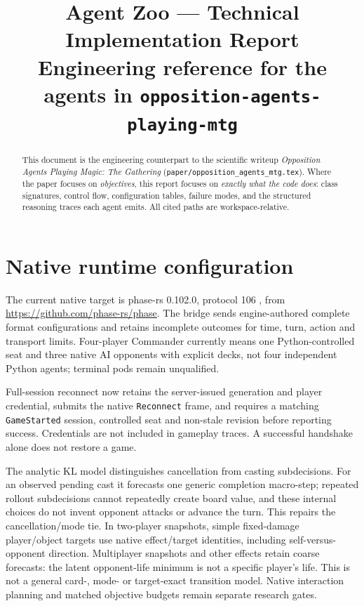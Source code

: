 \documentclass[11pt,a4paper]{article}
\title{\bfseries Agent Zoo --- Technical Implementation Report\\
       \large Engineering reference for the agents in
       \texttt{opposition-agents-playing-mtg}}
\author{}
\date{}
\begin{document}
\maketitle

\begin{abstract}
This document is the engineering counterpart to the scientific writeup
\emph{Opposition Agents Playing Magic: The Gathering} (\texttt{paper/opposition\_agents\_mtg.tex}).
Where the paper focuses on \emph{objectives}, this report focuses on
\emph{exactly what the code does}: class signatures, control flow,
configuration tables, failure modes, and the structured reasoning
traces each agent emits.  All cited paths are workspace-relative.
\end{abstract}

\tableofcontents
\bigskip

\section*{Native runtime configuration}

The current native target is phase-rs 0.102.0, protocol 106 \cite{phase2026engine},
from \url{https://github.com/phase-rs/phase}. The bridge sends
engine-authored complete format configurations and retains incomplete outcomes
for time, turn, action and transport limits. Four-player Commander currently
means one Python-controlled seat and three native AI opponents with explicit
decks, not four independent Python agents; terminal pods remain unqualified.

Full-session reconnect now retains the server-issued generation and player
credential, submits the native \texttt{Reconnect} frame, and requires a matching
\texttt{GameStarted} session, controlled seat and non-stale revision before
reporting success. Credentials are not included in gameplay traces. A successful
handshake alone does not restore a game.

The analytic KL model distinguishes cancellation from casting subdecisions.
For an observed pending cast it forecasts one generic completion macro-step;
repeated rollout subdecisions cannot repeatedly create board value, and these
internal choices do not invent opponent attacks or advance the turn. This
repairs the cancellation/mode tie. In two-player snapshots, simple fixed-damage
player/object targets use native effect/target identities, including
self-versus-opponent direction. Multiplayer snapshots and other effects retain
coarse forecasts: the latent opponent-life minimum is not a specific player's
life. This is not a general card-, mode-
or target-exact transition model. Native interaction planning and matched objective budgets
remain separate research gates.
\end{document}
